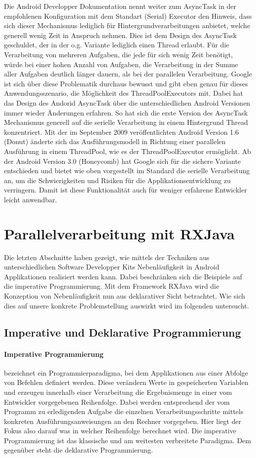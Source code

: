 \documentclass[12pt,oneside,a4paper,bibtotoc,liststotoc]{scrreprt}
\begin{document}
Die Android Developper Dokumentation nennt weiter zum AsyncTask in der empfohlenen Konfiguration mit dem Standart (Serial) Executor den Hinweis, dass sich dieser Mechanismus lediglich für Hintergrundverarbeitungen anbietet, welche generell wenig Zeit in Anspruch nehmen. Dies ist dem Design des AsyncTask geschuldet, der in der o.g. Variante lediglich einen Thread erlaubt. Für die Verarbeitung von mehreren Aufgaben, die jede für sich wenig Zeit benötigt, würde bei einer hohen Anzahl von Aufgaben, die Verarbeitung in der Summe aller Aufgaben deutlich länger dauern, als bei der parallelen Verarbeitung. Google ist sich über diese Problematik durchaus bewusst und gibt eben genau für dieses Anwendungsszenario, die Möglichkeit des ThreadPoolExecutors mit. Dabei hat das Design des Andorid AsyncTask über die unterschiedlichen Android Versionen immer wieder Änderungen erfahren. So hat sich die erste Version des AsyncTask Mechanismus generell auf die serielle Verarbeitung in einem Hintergrund Thread konzentriert. Mit der im September 2009 veröffentlichten Android Version 1.6 (Donut) änderte sich das Ausführungsmodell in Richtung einer parallelen Ausführung in einem ThreadPool, wie es der ThreadPoolExecutor ermöglicht. Ab der Android Version 3.0 (Honeycomb) hat Google sich für die sichere Variante entschieden und bietet wie oben vorgestellt im Standard die serielle Verarbeitung an, um die Schwierigkeiten und Risiken für die Applikationsentwicklung zu verringern. Damit ist diese Funktionalität auch für weniger erfahrene Entwickler leicht anwendbar.


\section{Parallelverarbeitung mit RXJava}
Die letzten Abschnitte haben gezeigt, wie mittels der Techniken aus unterschiedlichen Software Developper Kits Nebenläufigkeit in Android Applikationen realisiert werden kann. Dabei beschränken sich die Beispiele auf die imperative Programmierung. Mit dem Framework RXJava wird die Konzeption von Nebenläufigkeit nun aus deklarativer Sicht betrachtet. Wie sich dies auf unsere konkrete Problemstellung auswirkt wird im folgenden untersucht.
\subsection{Imperative und Deklarative Programmierung}
\paragraph{Imperative Programmierung} bezeichnet ein Programmierparadigma, bei dem Applikationen aus einer Abfolge von Befehlen definiert werden. Diese verändern Werte in gespeicherten Variablen und erzeugen innerhalb einer Verarbeitung die Ergebnismenge in einer vom Entwickler vorgegebenen Reihenfolge. Dabei werden entsprechend der vom Programm zu erledigenden Aufgabe die einzelnen Verarbeitungsschritte mittels konkreten Ausführungsanweisungen an den Rechner vorgegeben. Hier liegt der Fokus also darauf was in welcher Reihenfolge berechnet wird. Die imperative Programmierung ist das klassische und am weitesten verbreitete Paradigma. Dem gegenüber steht die deklarative Programmierung.
\end{document}
